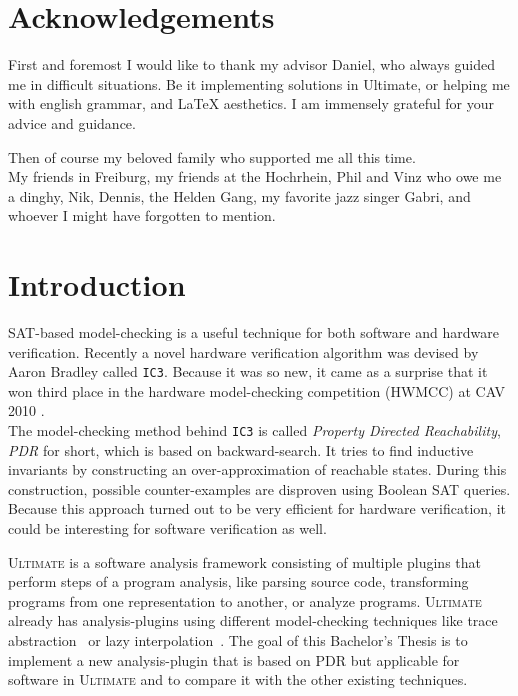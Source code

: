 \documentclass[11pt, a4paper, BCOR=10mm, ngerman]{scrbook}
\begin{document}
\chapter*{Acknowledgements}
First and foremost I would like to thank my advisor Daniel, who always guided me in difficult situations. Be it implementing solutions in Ultimate, or helping me with english grammar, and LaTeX aesthetics. I am immensely grateful for your advice and guidance. \par
Then of course my beloved family who supported me all this time. \\
My friends in Freiburg, my friends at the Hochrhein, Phil and Vinz who owe me a dinghy, Nik, Dennis, the Helden Gang, my favorite jazz singer Gabri, and whoever I might have forgotten to mention.


\tableofcontents


\mainmatter

\chapter{Introduction}
SAT-based model-checking is a useful technique for both software and hardware verification. 
Recently a novel hardware verification algorithm was devised by Aaron Bradley \cite{DBLP:conf/vmcai/Bradley11} called \texttt{IC3}.
Because it was so new, it came as a surprise that it won third place in the hardware
model-checking competition (HWMCC) at CAV 2010 \cite{cav}. \\ The model-checking method behind \texttt{IC3} is called \textsl{Property Directed Reachability}, \textsl{PDR} for short, which is based on backward-search. It tries to find inductive invariants by constructing an over-approximation of reachable states. During this construction, possible counter-examples are disproven using Boolean SAT queries. Because this approach turned out to be very efficient for hardware verification, it could be interesting for software verification as well. \par
\textsc{\textsc{Ultimate}} \cite{Zitat02} is a software analysis framework consisting of multiple plugins that perform steps of a program analysis, like parsing source code, transforming programs from one representation to another, or analyze programs.
 \textsc{\textsc{Ultimate}} already has analysis-plugins using different model-checking techniques like trace abstraction~\cite{DBLP:conf/cav/HeizmannHP13} or lazy interpolation~\cite{DBLP:conf/popl/HenzingerJMS02}.
The goal of this Bachelor's Thesis is to implement a new analysis-plugin that is based on PDR but applicable for software in \textsc{\textsc{Ultimate}} and to compare it with the other existing techniques. \par
\end{document}
